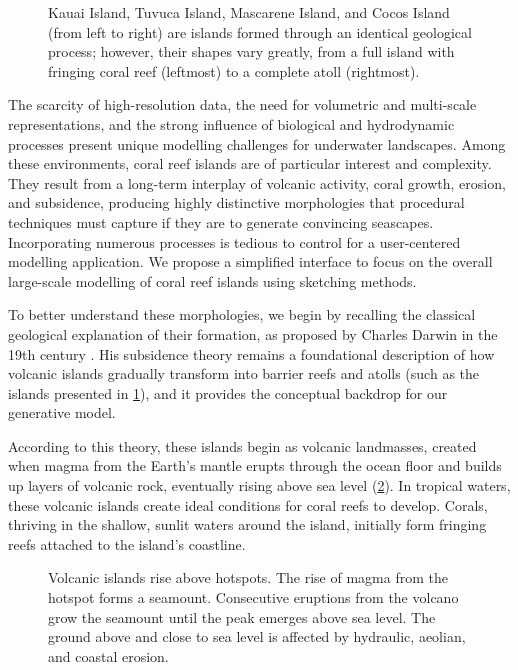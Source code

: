 \begin{figure}[H]
    \caption[Different islands with coral reefs]{Kauai Island, Tuvuca Island, Mascarene Island, and Cocos Island (from left to right) are islands formed through an identical geological process; however, their shapes vary greatly, from a full island with fringing coral reef (leftmost) to a complete atoll (rightmost).}
    \label{fig:coral-island-island-examples}
\end{figure}

The scarcity of high-resolution data, the need for volumetric and multi-scale representations, and the strong influence of biological and hydrodynamic processes present unique modelling challenges for underwater landscapes. Among these environments, coral reef islands are of particular interest and complexity. They result from a long-term interplay of volcanic activity, coral growth, erosion, and subsidence, producing highly distinctive morphologies that procedural techniques must capture if they are to generate convincing seascapes. Incorporating numerous processes is tedious to control for a user-centered modelling application. We propose a simplified interface to focus on the overall large-scale modelling of coral reef islands using sketching methods.

To better understand these morphologies, we begin by recalling the classical geological explanation of their formation, as proposed by Charles Darwin in the 19th century \cite{Darwin1842}. His subsidence theory remains a foundational description of how volcanic islands gradually transform into barrier reefs and atolls (such as the islands presented in \cref{fig:coral-island-island-examples}), and it provides the conceptual backdrop for our generative model.

According to this theory, these islands begin as volcanic landmasses, created when magma from the Earth's mantle erupts through the ocean floor and builds up layers of volcanic rock, eventually rising above sea level (\cref{fig:coral-island-island-growth}). In tropical waters, these volcanic islands create ideal conditions for coral reefs to develop. Corals, thriving in the shallow, sunlit waters around the island, initially form fringing reefs attached to the island's coastline.

\begin{figure}[H]
    \caption[Volcanic island formation process]{Volcanic islands rise above hotspots. The rise of magma from the hotspot forms a seamount. Consecutive eruptions from the volcano grow the seamount until the peak emerges above sea level. The ground above and close to sea level is affected by hydraulic, aeolian, and coastal erosion.}
    \label{fig:coral-island-island-growth}
\end{figure}

